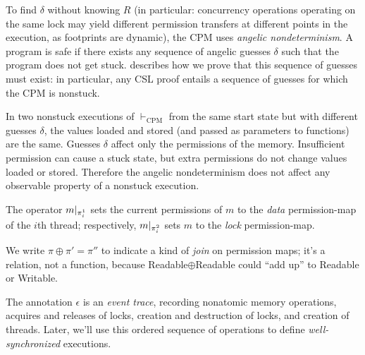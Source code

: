 To find $\delta$ without knowing $R$ (in particular: concurrency
operations operating on the same lock may yield different permission
transfers at different points in the execution, as footprints are
dynamic), the CPM uses \emph{angelic nondeterminism}.  A program is
safe if there exists any sequence of angelic guesses $\delta$ such
that the program does not get stuck.
 describes how we prove that
this sequence of guesses must exist: in particular, any CSL proof
entails a sequence of guesses for which the CPM is nonstuck.

In two nonstuck executions of $\vdash_\mathrm{CPM}$ from the same
start \linebreak[3] state but with different guesses $\delta$, the
values loaded and stored (and passed as parameters to functions) are
the same.  Guesses $\delta$ affect only the permissions of the memory.
Insufficient permission can cause a stuck state, but extra permissions
do not change values loaded or stored.  Therefore the angelic
nondeterminism does not affect any observable property of a nonstuck
execution.

The operator $m |_{\pi^1_i}$ sets the current
permissions of $m$ to the \emph{data} permission-map of the $i$th thread;
respectively, $m |_{\pi^2_i}$ sets $m$ to the \emph{lock} permission-map.

We write $\pi\oplus\pi'=\pi''$ to indicate a kind of
\emph{join} on permission maps; it's a relation, not a function,
because Readable$\oplus$Readable
could ``add up'' to 
Readable or Writable.

The annotation $\epsilon$ is an \emph{event trace}, recording
nonatomic memory operations, acquires and releases of locks, creation
and destruction of locks, and creation of threads.  Later, we'll use
this ordered sequence of operations to define
\emph{well-synchronized} executions.

